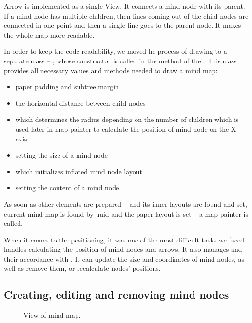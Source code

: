 Arrow is implemented as a single View. It connects a mind node with its parent. If a mind node has multiple children, then lines coming out of the child nodes are connected in one point and then a single line goes to the parent node. It makes the whole map more readable. 

In order to keep the code readability, we moved he process of drawing to a separate class -- , whose constructor is called in the  method of the . This class provides all necessary values and methods needed to draw a mind map:
\begin{itemize}
	\item paper padding and  subtree margin
	\item the horizontal distance between child nodes
	\item {} which determines the radius depending on the number of children which is used later in map painter to calculate the position of mind node on the X axis
	\item {} setting the size of a mind node
	\item {} which initializes inflated mind node layout  
	\item {} setting the content of a mind node
\end{itemize}
 As soon as other elements are prepared --   and its inner  layouts are found and set, current mind map is found by uuid and the paper layout is set -- a map painter is called. 

When it comes to the positioning, it was one of the most difficult tasks we faced.  handles calculating the position of mind nodes and arrows. It also manages  and their accordance with . It can update the size and coordinates of mind nodes, as well as remove them, or recalculate nodes' positions. 

\subsection{Creating, editing and removing mind nodes}
\label{subsec:drawing}



\begin{figure}[h]
	\centering
	\caption{View of mind map.}
	\label{fig:screen-map}
\end{figure}

